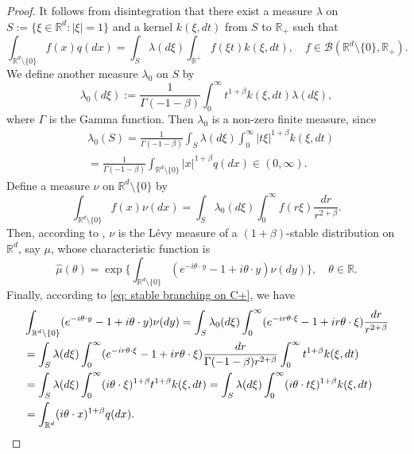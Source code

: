 \documentclass[12pt,a4paper]{amsart}
\theoremstyle{plain}
\theoremstyle{definition}
\numberwithin{equation}{section}
\begin{document}
\begin{proof}
  It follows from disintegration that there exist a measure $\lambda$ on $S:= \{\xi\in \mathbb R^d:|\xi| = 1\}$ and a kernel $k(\xi,dt)$ from $S$ to $\mathbb R_+$ such that
  \[
    \int_{\mathbb R^d\setminus \{0\}} f(x)q(dx) 
    = \int_S \lambda(d\xi) \int_{\mathbb R^+} f(\xi t)k(\xi,dt),\quad
    f\in \mathcal B(\mathbb R^d\setminus \{0\}, \mathbb R_+).
  \]
  We define another measure $\lambda_0$ on $S$ by
  \[
    \lambda_0(d\xi) 
    := \frac1{\Gamma(-1-\beta)}\int_0^\infty t^{1+\beta}k(\xi,dt) \lambda (d\xi),
  \]
  where $\Gamma$ is the Gamma function.
  Then $\lambda_0$ is a non-zero finite measure, since
  \begin{align}
    &\lambda_0(S) 
      = \frac{1}{\Gamma(-1-\beta)} \int_S \lambda (d\xi) \int_0^\infty |t\xi|^{1+\beta}k(\xi,dt) \\
    & = \frac{1}{\Gamma(-1-\beta)} \int_{\mathbb R^d\setminus\{0\}} |x|^{1+\beta} q(dx) \in (0,\infty).
  \end{align}
  Define a measure $\nu$ on $\mathbb R^d\setminus\{0\}$ by
  \[
    \int_{\mathbb R^d\setminus\{0\}}f(x)\nu(dx)
    = \int_{S} \lambda_0(d\xi) \int_0^\infty f(r\xi) \frac{dr}{r^{2+\beta}} .
  \]
  Then, according to \cite[Remark 14.4]{Sato2013Levy}, $\nu$ is the L\'evy measure of a $(1+\beta)$-stable distribution on $\mathbb R^d$, say $\mu$, whose characteristic function is
  \[
    \hat \mu(\theta)
    = \exp \Big \{ \int_{\mathbb R^d\setminus\{0\}} (e^{-i\theta \cdot y}-1+i\theta \cdot y) \nu(dy) \Big \}
    , \quad \theta \in \mathbb R.
  \]
  Finally, according to \eqref{eq: stable branching on C+}, we have
  \begin{align}
    & \int_{\mathbb R^d\setminus\{0\}} (e^{-i\theta \cdot y}-1+i\theta \cdot y) \nu(dy)
      = \int_S \lambda_0(d\xi) \int_0^\infty (e^{-ir\theta \cdot \xi}-1+ir\theta \cdot \xi) \frac{dr}{r^{2+\beta}} \\
    & = \int_S \lambda (d\xi) \int_0^\infty (e^{-ir\theta \cdot \xi}-1+ir\theta \cdot \xi) \frac{dr}{\Gamma(-1-\beta)r^{2+\beta}}\int_0^\infty t^{1+\beta} k(\xi,dt) \\
    & = \int_S \lambda (d\xi) \int_0^\infty (i\theta\cdot \xi)^{1+\beta} t^{1+\beta} k(\xi,dt)
      = \int_S \lambda(d\xi) \int_0^\infty (i\theta \cdot t\xi)^{1+\beta} k(\xi,dt) \\
    & = \int_{\mathbb R^d} (i\theta \cdot x)^{1+\beta} q(dx).
      \qedhere
  \end{align}
\end{proof}
\end{document}
